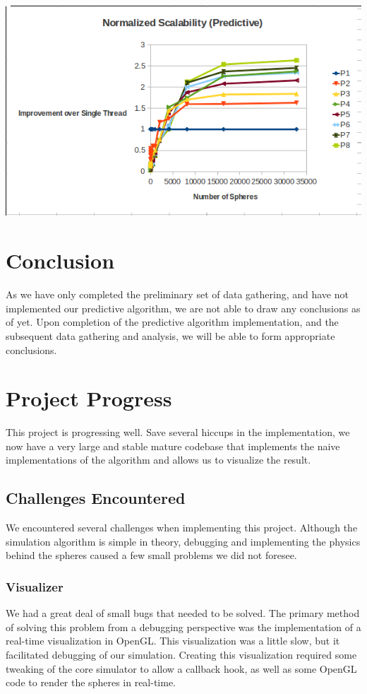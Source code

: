 \documentclass[conference]{IEEEtran}
\begin{document}
\begin{center}
	\includegraphics[width=.45\textwidth]{normalized_scalability_predictive.png}
\end{center}

\section{Conclusion} 


As we have only completed the preliminary set of data gathering, and have not implemented our predictive algorithm, we are not able to draw any conclusions as of yet.  Upon completion of the predictive algorithm implementation, and the subsequent data gathering and analysis, we will be able to form appropriate conclusions.




\appendix %
\section{Project Progress}
This project is progressing well.  Save several hiccups in the implementation, we now have a very large and stable mature codebase that implements the naive implementations of the algorithm and allows
us to visualize the result.
\subsection{Challenges Encountered}
We encountered several challenges when implementing this project.  Although the simulation algorithm is simple in theory, debugging and implementing the physics behind the spheres caused a few small problems we did not foresee.

\subsubsection{Visualizer}
We had a great deal of small bugs that needed to be solved.  The primary method of solving this problem from a debugging perspective was the implementation of a real-time visualization in OpenGL.
This visualization was a little slow, but it facilitated debugging of our simulation.  Creating this visualization required some tweaking of the core simulator to allow a callback hook, as well as some OpenGL code to render the spheres in real-time.
\end{document}

